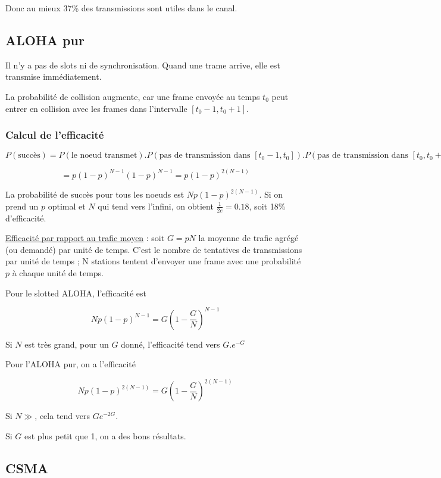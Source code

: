 		Donc au mieux 37\% des transmissions sont utiles dans le canal.
	
	\subsection{ALOHA pur}

	Il n'y a pas de slots ni de synchronisation. Quand une trame arrive, elle est transmise immédiatement. 		
	
	
	La probabilité de collision augmente, car une frame envoyée au temps $t_0$ peut entrer en collision avec les frames dans l'intervalle $[t_0 - 1, t_0 + 1]$.
	
		\subsubsection{Calcul de l'efficacité}
		
		$$P(\text{succès}) = P(\text{le noeud transmet}) .  P(\text{pas de transmission dans } [t_0 - 1, t_0]) .  P(\text{pas de transmission dans } [t_0, t_0 + 1])$$

		$$= p (1 - p)^{N - 1} (1 - p)^{N - 1} = p(1 - p)^{2 (N - 1)}$$
		
		La probabilité de succès pour tous les noeuds est $Np(1 - p)^{2 (N - 1)}$. Si on prend un $p$ optimal et $N$ qui tend vers l'infini, on obtient $\frac{1}{2e} = 0.18$, soit 18\% d'efficacité.
	
	
		\underline{Efficacité par rapport au trafic moyen} : soit $G = pN$ la moyenne de trafic agrégé (ou demandé) par unité de temps. C'est le nombre de tentatives de transmissions par unité de temps ; N stations tentent d'envoyer une frame avec une probabilité $p$ à chaque unité de temps.
		
		Pour le slotted ALOHA, l'efficacité est
		
		$$N p (1 - p)^{N - 1} = G (1 - \frac{G}{N})^{N - 1}$$
		
		Si $N$ est très grand, pour un $G$ donné, l'efficacité tend vers $G . e^{-G}$
		
		Pour l'ALOHA pur, on a l'efficacité
		
		$$N p (1 - p)^{2(N - 1)} = G (1 - \frac{G}{N})^{2(N - 1)}$$
	
		Si $N \gg$, cela tend vers $G e^{-2G}$.
		
		Si $G$ est plus petit que 1, on a des bons résultats.
		
		
		
	\subsection{CSMA}
	
